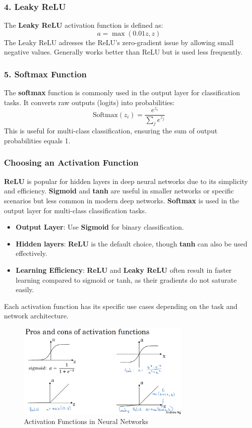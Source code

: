 \documentclass[letterpaper,12pt,notitlepage,twoside]{report}
\begin{document}
\subsubsection{4. Leaky ReLU}
The \textbf{Leaky ReLU} activation function is defined as:
\[
a = \max(0.01z, z)
\]
The Leaky ReLU adresses the ReLU's zero-gradient issue by allowing small negative values. Generally works better than ReLU but is used less frequently.

\subsubsection{5. Softmax Function}
The \textbf{softmax} function is commonly used in the output layer for classification tasks. It converts raw outputs (logits) into probabilities:
\[
\text{Softmax}(z_i) = \frac{e^{z_i}}{\sum_{j}e^{z_j}}
\]
This is useful for multi-class classification, ensuring the sum of output probabilities equals 1.

\subsubsection{Choosing an Activation Function}
\textbf{ReLU} is popular for hidden layers in deep neural networks due to its simplicity and efficiency.  \textbf{Sigmoid} and \textbf{tanh} are useful in smaller networks or specific scenarios but less common in modern deep networks.  \textbf{Softmax} is used in the output layer for multi-class classification tasks.
\begin{itemize}
    \item \textbf{Output Layer}: Use \textbf{Sigmoid} for binary classification.
    \item \textbf{Hidden layers}: \textbf{ReLU} is the default choice, though \textbf{tanh} can also be used effectively.
    \item \textbf{Learning Efficiency}: \textbf{ReLU} and \textbf{Leaky ReLU} often result in faster learning compared to sigmoid or tanh, as their gradients do not saturate easily.
\end{itemize}

Each activation function has its specific use cases depending on the task and network architecture.

\begin{figure}[h]
	\centering
	\includegraphics[width=0.75\textwidth]{Images/Activation functions.png}
	\caption{Activation Functions in Neural Networks}
	\label{fig:15}
\end{figure}
\FloatBarrier
\end{document}
